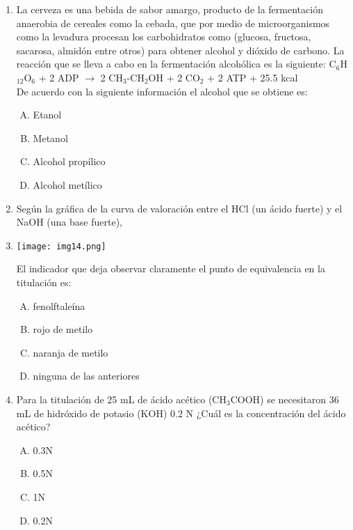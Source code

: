 \begin{enumerate}


\item  La cerveza es una bebida de sabor amargo, producto de la fermentación anaerobia de cereales como la cebada, que por medio de microorganismos como la levadura procesan los carbohidratos como (glucosa, fructosa, sacarosa, almidón entre otros) para obtener alcohol y dióxido de carbono. La reacción que se lleva a cabo en la fermentación alcohólica es la siguiente: C$_6$H$_12$O$_6$ + 2 ADP $\longrightarrow$ 2 CH$_3$-CH$_2$OH + 2 CO$_2$ + 2 ATP + 25.5 kcal \label{jenn-10}\\
De acuerdo con la siguiente información el alcohol que se obtiene es:


\begin{enumerate}[(A)]
\item Etanol
\item Metanol
\item Alcohol propílico
\item Alcohol metílico
\end{enumerate}




\item Según la gráfica de la curva de valoración entre el HCl (un ácido fuerte) y el NaOH (una base fuerte), 
 \label{jenn-11}


\item \texttt{[image: img14.png]}

El indicador que deja observar claramente el punto de equivalencia en la titulación es:

\begin{enumerate}[(A)]
\item   fenolftaleína
\item rojo de metilo
\item naranja de metilo
\item ninguna de las anteriores
\end{enumerate}




\newpage
\item  Para la titulación de 25 mL de ácido acético (CH$_3$COOH) se necesitaron 36 mL de hidróxido de potasio (KOH) 0.2 N ¿Cuál es la concentración del ácido acético? \label{jenn-12}


\begin{enumerate}[(A)]
\item   0.3N 
\item 0.5N
\item 1N
\item 0.2N
\end{enumerate}



\end{enumerate}
